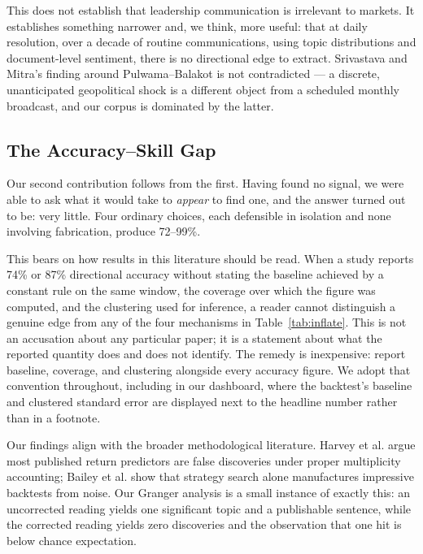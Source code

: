 \documentclass[11pt]{article}
\begin{document}
This does not establish that leadership communication is irrelevant to markets. It establishes something narrower and, we think, more useful: that at daily resolution, over a decade of routine communications, using topic distributions and document-level sentiment, there is no directional edge to extract. Srivastava and Mitra's finding \cite{srivastava2019} around Pulwama--Balakot is not contradicted --- a discrete, unanticipated geopolitical shock is a different object from a scheduled monthly broadcast, and our corpus is dominated by the latter.

\subsection{The Accuracy--Skill Gap}

Our second contribution follows from the first. Having found no signal, we were able to ask what it would take to \textit{appear} to find one, and the answer turned out to be: very little. Four ordinary choices, each defensible in isolation and none involving fabrication, produce 72--99\%.

This bears on how results in this literature should be read. When a study reports 74\% \cite{jain2023} or 87\% \cite{biswal2022} directional accuracy without stating the baseline achieved by a constant rule on the same window, the coverage over which the figure was computed, and the clustering used for inference, a reader cannot distinguish a genuine edge from any of the four mechanisms in Table~\ref{tab:inflate}. This is not an accusation about any particular paper; it is a statement about what the reported quantity does and does not identify. The remedy is inexpensive: report baseline, coverage, and clustering alongside every accuracy figure. We adopt that convention throughout, including in our dashboard, where the backtest's baseline and clustered standard error are displayed next to the headline number rather than in a footnote.

Our findings align with the broader methodological literature. Harvey et al. \cite{harvey2016} argue most published return predictors are false discoveries under proper multiplicity accounting; Bailey et al. \cite{bailey2014} show that strategy search alone manufactures impressive backtests from noise. Our Granger analysis is a small instance of exactly this: an uncorrected reading yields one significant topic and a publishable sentence, while the corrected reading yields zero discoveries and the observation that one hit is below chance expectation.
\end{document}
